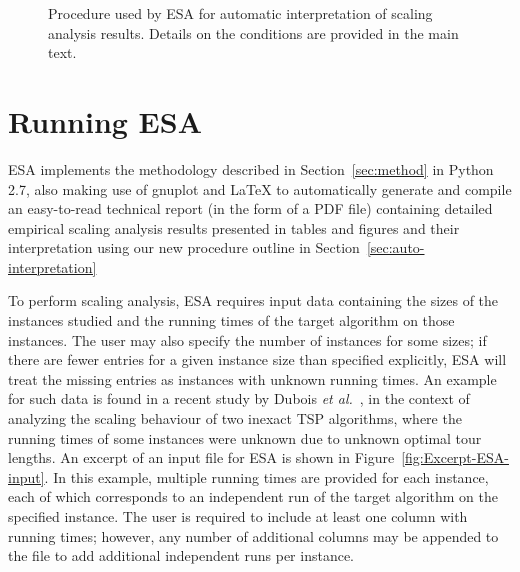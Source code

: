 \documentclass[aic]{iosart2x}
\newcommand{\etal}{\emph{et al.}}
\begin{document}
\begin{figure}[t]
\begin{centering}
{{\begin{tikzpicture}[node distance = 7em, auto]
\end{tikzpicture}}
}

\par\end{centering}{\small \par}

\caption{Procedure used by ESA for automatic interpretation of scaling analysis results. Details on the conditions are provided in the main text.}\label{fig:ESA-auto-interpretation}
\end{figure}


\section{Running ESA}
\label{sec:Implementation and Use}

ESA implements the methodology described in Section~\ref{sec:method} in Python 2.7, also making use of gnuplot and \LaTeX{} to automatically generate and compile an easy-to-read technical report (in the form of a PDF file) containing detailed empirical scaling analysis results presented in tables and figures and their interpretation using our new procedure outline in Section~\ref{sec:auto-interpretation}

\label{sec:ESA-Input}

To perform scaling analysis, ESA requires input data containing the sizes of the instances studied and the running times of the target algorithm on those instances. 
The user may also specify the number of instances for some sizes; if there are fewer entries for a given instance size than specified explicitly, ESA will treat the missing entries as instances with unknown running times. 
An example for such data is found in a recent study by Dubois \etal~\cite{DubEtAl15}, in the context of analyzing the scaling behaviour of two inexact TSP algorithms, where the running times of some instances were unknown due to unknown optimal tour lengths. 
An excerpt of an input file for ESA is shown in Figure~\ref{fig:Excerpt-ESA-input}. 
In this example, multiple running times are provided for each instance, each of which corresponds to an independent run of the target algorithm on the specified instance. The user is required to include at least one column with running times; however, any number of additional columns may be appended to the file to add additional independent runs per instance. 
\end{document}
